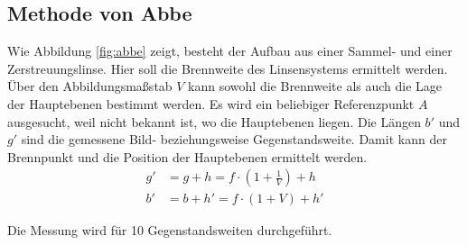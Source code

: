 \subsection{Methode von Abbe}
Wie Abbildung \ref{fig:abbe} zeigt, besteht der Aufbau aus einer Sammel- und einer Zerstreuungslinse. Hier soll die Brennweite des Linsensystems ermittelt werden. Über den Abbildungsmaßstab $V$ kann sowohl die Brennweite als auch die Lage der Hauptebenen bestimmt werden. Es wird ein beliebiger Referenzpunkt $A$ ausgesucht, weil nicht bekannt ist, wo die Hauptebenen liegen. Die Längen $b'$ und $g'$ sind die gemessene Bild- beziehungsweise Gegenstandsweite. Damit kann der Brennpunkt und die Position der Hauptebenen ermittelt werden.
\begin{align}
  \label{eqn:abbe}
  g' &= g + h = f \cdot\left( 1+\frac{1}{V}\right)+h\\
  b' &= b + h' = f \cdot (1 + V) + h'
\end{align}

Die Messung wird für 10 Gegenstandsweiten durchgeführt.
